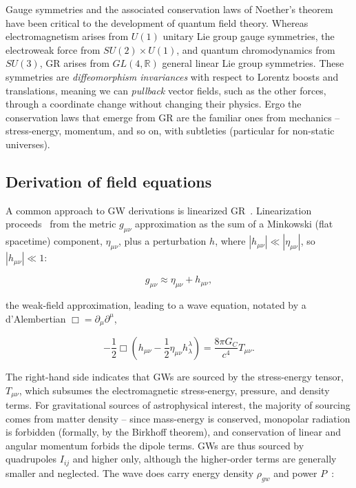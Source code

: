 Gauge symmetries and the associated conservation laws of Noether's theorem have been critical to the development of quantum field theory. 
Whereas electromagnetism arises from $U(1)$ unitary Lie group gauge symmetries, the electroweak force from $SU(2) \times U(1)$, and quantum chromodynamics from $SU(3)$, GR arises from $GL(4, \mathbb{R})$ general linear Lie group symmetries. 
These symmetries are \textit{diffeomorphism invariances} with respect to Lorentz boosts and translations, meaning we can \textit{pullback} vector fields, such as the other forces, through a coordinate change without changing their physics.
Ergo the conservation laws that emerge from GR are the familiar ones from mechanics -- stress-energy, momentum, and so on, with subtleties (particular for non-static universes).



        \subsection{Derivation of field equations}
        \label{field_equations}

            A common approach to GW derivations is linearized GR~\cite{FlanaganHughes2005}.
            Linearization proceeds~\cite{AdhikariThesis} from the metric $g_{\mu\nu}$ approximation as the sum of a Minkowski (flat spacetime) component, $\eta_{\mu\nu}$, plus a perturbation $h$, where $|h_{\mu\nu}| \ll |\eta_{\mu\nu}|$, so $|h_{\mu\nu}| \ll 1$:

\begin{equation}
g_{\mu \nu} \approx \eta_{\mu \nu} + h_{\mu \nu},
\label{perturbation_eq}
\end{equation}

\noindent the weak-field approximation, leading to a wave equation, notated by a d'Alembertian $\Box = \partial_\mu \partial^\mu$,

\begin{equation}
-\frac{1}{2} \Box \left(h_{\mu \nu} - \frac{1}{2} \eta_{\mu \nu} h_{\lambda}^{\lambda} \right) = \frac{8 \pi G_C}{c^4} T_{\mu \nu}.
\label{Ballmer_wave_eq}
\end{equation}

The right-hand side indicates that GWs are sourced by the stress-energy tensor, $T_{\mu\nu}$, which subsumes the electromagnetic stress-energy, pressure, and density terms. 
For gravitational sources of astrophysical interest, the majority of sourcing comes from matter density -- since mass-energy is conserved, monopolar radiation is forbidden (formally, by the Birkhoff theorem), and conservation of linear and angular momentum forbids the dipole terms. 
GWs are thus sourced by quadrupoles $I_{ij}$ and higher only, although the higher-order terms are generally smaller and neglected. 
The wave does carry energy density $\rho_{gw}$ and power $P$~\cite{BallmerThesis}:

